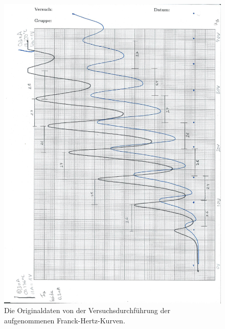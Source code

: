 \begin{figure}
    \centering
    \includegraphics[width=\textwidth]{bilder/versuch_teil2.pdf}
    \caption{Die Originaldaten von der Versuchsdurchführung der aufgenommenen Franck-Hertz-Kurven.}
    \label{fig:originaldaten_teil2}
\end{figure}